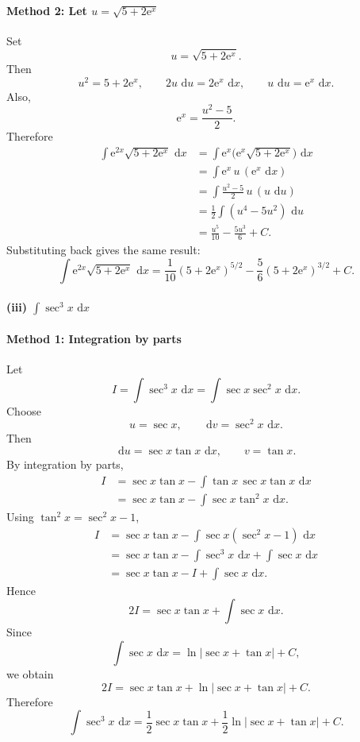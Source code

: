 \documentclass[12pt]{article}
\newcommand{\dd}{\,\mathrm{d}}
\newcommand{\ee}{\mathrm{e}}
\begin{document}
\paragraph{Method 2: Let \(u=\sqrt{5+2\ee^x}\)}
Set
\[
u=\sqrt{5+2\ee^x}.
\]
Then
\[
u^2=5+2\ee^x,
\qquad
2u\,\dd u=2\ee^x\,\dd x,
\qquad
u\,\dd u=\ee^x\,\dd x.
\]
Also,
\[
\ee^x=\frac{u^2-5}{2}.
\]
Therefore
\begin{align*}
\int \ee^{2x}\sqrt{5+2\ee^x}\,\dd x
&=\int \ee^x\bigl(\ee^x\sqrt{5+2\ee^x}\bigr)\,\dd x \\
&=\int \ee^x\,u\,(\ee^x\,\dd x) \\
&=\int \frac{u^2-5}{2}\,u\,(u\,\dd u) \\
&=\frac{1}{2}\int (u^4-5u^2)\,\dd u \\
&=\frac{u^5}{10}-\frac{5u^3}{6}+C.
\end{align*}
Substituting back gives the same result:
\[
\boxed{\int \ee^{2x}\sqrt{5+2\ee^x}\,\dd x
=\frac{1}{10}(5+2\ee^x)^{5/2}-\frac{5}{6}(5+2\ee^x)^{3/2}+C.}
\]

\paragraph{(iii) \(\displaystyle \int \sec^3 x\,\dd x\)}

\paragraph{Method 1: Integration by parts}
Let
\[
I=\int \sec^3 x\,\dd x=\int \sec x\sec^2 x\,\dd x.
\]
Choose
\[
u=\sec x,
\qquad
\dd v=\sec^2 x\,\dd x.
\]
Then
\[
\dd u=\sec x\tan x\,\dd x,
\qquad
v=\tan x.
\]
By integration by parts,
\begin{align*}
I
&=\sec x\tan x-\int \tan x\,\sec x\tan x\,\dd x \\
&=\sec x\tan x-\int \sec x\tan^2 x\,\dd x.
\end{align*}
Using \(\tan^2 x=\sec^2 x-1\),
\begin{align*}
I
&=\sec x\tan x-\int \sec x(\sec^2 x-1)\,\dd x \\
&=\sec x\tan x-\int \sec^3 x\,\dd x+\int \sec x\,\dd x \\
&=\sec x\tan x-I+\int \sec x\,\dd x.
\end{align*}
Hence
\[
2I=\sec x\tan x+\int \sec x\,\dd x.
\]
Since
\[
\int \sec x\,\dd x=\ln|\sec x+\tan x|+C,
\]
we obtain
\[
2I=\sec x\tan x+\ln|\sec x+\tan x|+C.
\]
Therefore
\[
\boxed{\int \sec^3 x\,\dd x
=\frac{1}{2}\sec x\tan x+\frac{1}{2}\ln|\sec x+\tan x|+C.}
\]
\end{document}
